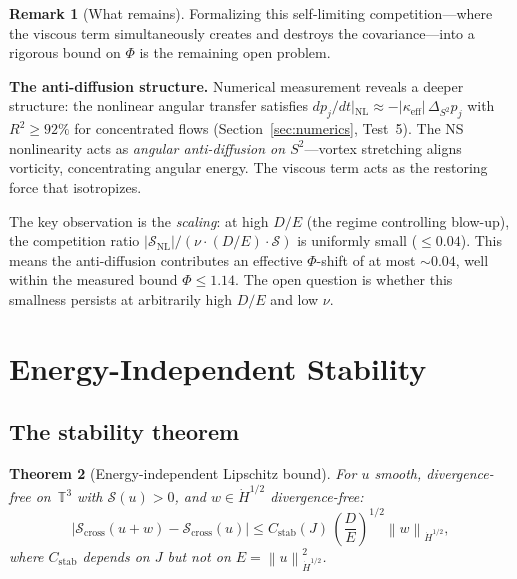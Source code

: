 \documentclass[11pt]{article}
\newtheorem{theorem}{Theorem}[section]
\theoremstyle{definition}
\newtheorem{remark}[theorem]{Remark}
\newcommand{\T}{\mathbb{T}}
\newcommand{\norm}[1]{\left\| #1 \right\|}
\newcommand{\Hdot}[1]{\dot{H}^{#1}}
\newcommand{\cS}{\mathcal{S}}
\begin{document}
\begin{remark}[What remains]
Formalizing this self-limiting competition---where the
viscous term simultaneously creates and destroys the
covariance---into a rigorous bound on $\Phi$ is the
remaining open problem.

\smallskip\noindent\textbf{The anti-diffusion structure.}
Numerical measurement reveals a deeper structure:
the nonlinear angular transfer satisfies
$dp_j/dt|_{\mathrm{NL}}
\approx -|\kappa_{\mathrm{eff}}|\,\Delta_{S^2} p_j$
with $R^2 \geq 92\%$ for concentrated flows
(Section~\ref{sec:numerics}, Test~5).
The NS nonlinearity acts as \emph{angular anti-diffusion
on $S^2$}---vortex stretching aligns vorticity,
concentrating angular energy.  The viscous term acts as
the restoring force that isotropizes.

The key observation is the \emph{scaling}: at high $D/E$
(the regime controlling blow-up), the competition ratio
$|\cS_{\mathrm{NL}}|/(\nu\cdot(D/E)\cdot\cS)$ is
uniformly small ($\leq 0.04$).  This means the
anti-diffusion contributes an effective $\Phi$-shift of
at most $\sim 0.04$, well within the measured bound
$\Phi \leq 1.14$.  The open question is whether this
smallness persists at arbitrarily high $D/E$ and low
$\nu$.
\end{remark}


\section{Energy-Independent Stability}
\label{sec:stability}

\subsection{The stability theorem}

\begin{theorem}[Energy-independent Lipschitz bound]
\label{thm:stability}
For $u$ smooth, divergence-free on~$\T^3$ with
$\cS(u) > 0$, and $w \in \Hdot{1/2}$ divergence-free:
\begin{equation}\label{eq:stability}
|\cS_{\mathrm{cross}}(u+w) - \cS_{\mathrm{cross}}(u)|
\leq C_{\mathrm{stab}}(J)\,
\left(\frac{D}{E}\right)^{1/2}\norm{w}_{\Hdot{1/2}},
\end{equation}
where $C_{\mathrm{stab}}$ depends on $J$ but
\emph{not on} $E = \norm{u}_{\Hdot{1/2}}^2$.
\end{theorem}
\end{document}
